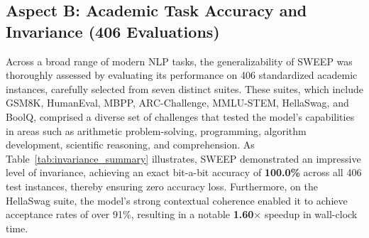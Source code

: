 \documentclass[journal,10pt,twocolumn]{article}
\theoremstyle{definition}
\begin{document}
\subsection{Aspect B: Academic Task Accuracy and Invariance (406 Evaluations)}

Across a broad range of modern NLP tasks, the generalizability of SWEEP was thoroughly assessed by evaluating its performance on 406 standardized academic instances, carefully selected from seven distinct suites. These suites, which include GSM8K, HumanEval, MBPP, ARC-Challenge, MMLU-STEM, HellaSwag, and BoolQ, comprised a diverse set of challenges that tested the model's capabilities in areas such as arithmetic problem-solving, programming, algorithm development, scientific reasoning, and comprehension. As Table~\ref{tab:invariance_summary} illustrates, SWEEP demonstrated an impressive level of invariance, achieving an exact bit-a-bit accuracy of \textbf{100.0\%} across all 406 test instances, thereby ensuring zero accuracy loss. Furthermore, on the HellaSwag suite, the model's strong contextual coherence enabled it to achieve acceptance rates of over 91\%, resulting in a notable \textbf{1.60$\times$} speedup in wall-clock time.

\begin{table}[ht]
\centering
{}
\caption{Cross-Domain Benchmark Invariance and Speedup (406 Evaluations Total).}
\label{tab:invariance_summary}
\end{table}
\end{document}
